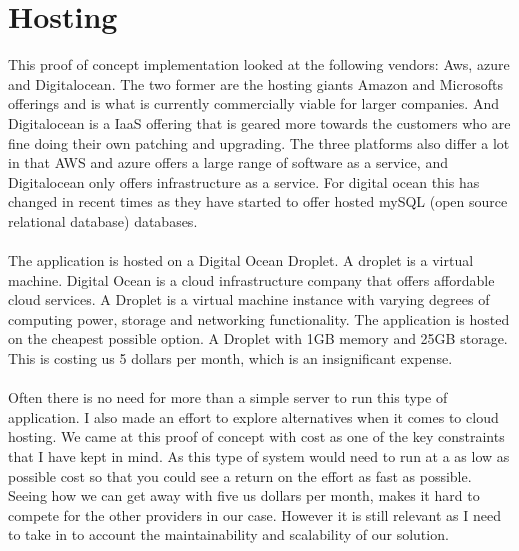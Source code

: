 \documentclass[]{uiophd}
\begin{document}
\section{Hosting}
This proof of concept implementation looked at the following vendors: Aws, azure and Digitalocean. The two former are the hosting giants Amazon and Microsofts offerings and is what is currently commercially viable for larger companies. And Digitalocean is a IaaS offering that is geared more towards the customers who are fine doing their own patching and upgrading. The three platforms also differ a lot in that AWS and azure offers a large range of software as a service, and Digitalocean only offers infrastructure as a service. For digital ocean this has changed in recent times as they have started to offer hosted mySQL (open source relational database) databases.
\\\\
The application is hosted on a Digital Ocean Droplet. A droplet is a virtual machine. Digital Ocean is a cloud infrastructure company that offers affordable cloud services. A Droplet is a virtual machine instance with varying degrees of computing power, storage and networking functionality. The application is hosted on the cheapest possible option. A Droplet with 1GB memory and 25GB storage. This is costing us 5 dollars per month, which is an insignificant expense. 
\\\\
Often there is no need for more than a simple server to run this type of application. I also made an effort to explore alternatives when it comes to cloud hosting. We came at this proof of concept with cost as one of the key constraints that I have kept in mind. As this type of system would need to run at a as low as possible cost so that you could see a return on the effort as fast as possible. Seeing how we can get away with five us dollars per month, makes it hard to compete for the other providers in our case. However it is still relevant as I need to take in to account the maintainability and scalability of our solution.
\end{document}
